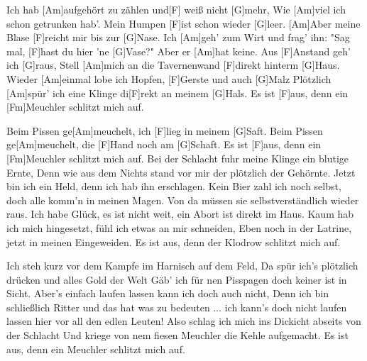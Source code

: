 

\begin{guitar}
	\vspace*{-0.1em}
	Ich hab [Am]aufgehört zu zählen und[F] weiß nicht [G]mehr,
	Wie [Am]viel ich schon getrunken hab'. Mein Humpen [F]ist schon wieder [G]leer.
	[Am]Aber meine Blase [F]reicht mir bis zur [G]Nase.
	Ich [Am]geh' zum Wirt und frag' ihn: "Sag mal, [F]hast du hier 'ne [G]Vase?"
	Aber er [Am]hat keine. Aus [F]Anstand geh' ich [G]raus,
	Stell [Am]mich an die Tavernenwand [F]direkt hinterm [G]Haus.
	Wieder [Am]einmal lobe ich Hopfen, [F]Gerste und auch [G]Malz
	Plötzlich [Am]spür' ich eine Klinge di[F]rekt an meinem [G]Hals.
	Es ist [F]aus, denn ein [Fm]Meuchler schlitzt mich auf.
	
	\vspace*{-0.1em}
	Beim Pissen ge[Am]meuchelt, ich [F]lieg in meinem [G]Saft.
	Beim Pissen ge[Am]meuchelt, die [F]Hand noch am [G]Schaft.
	Es ist [F]aus, denn ein [Fm]Meuchler schlitzt mich auf.
	\tiny
	\footnotesize{}
	Bei der Schlacht fuhr meine Klinge ein blutige Ernte,
	Denn wie aus dem Nichts stand vor mir der plötzlich der Gehörnte.
	Jetzt bin ich ein Held, denn ich hab ihn erschlagen.
	Kein Bier zahl ich noch selbst, doch alle komm’n in meinen Magen.
	Von da müssen sie selbstverständlich wieder raus.
	Ich habe Glück, es ist nicht weit, ein Abort ist direkt im Haus.
	Kaum hab ich mich hingesetzt, fühl ich etwas an mir schneiden,
	Eben noch in der Latrine, jetzt in meinen Eingeweiden.
	Es ist aus, denn der Klodrow schlitzt mich auf.
	
	 
	
	Ich steh kurz vor dem Kampfe im Harnisch auf dem Feld,
	Da spür ich’s plötzlich drücken und alles Gold der Welt
	Gäb’ ich für nen Pisspagen doch keiner ist in Sicht.
	Aber’s einfach laufen lassen kann ich doch auch nicht,
	Denn ich bin schließlich Ritter und das hat was zu bedeuten
	... ich kann’s doch nicht laufen lassen hier vor all den edlen Leuten!
	Also schlag ich mich ins Dickicht abseits von der Schlacht
	Und kriege von nem fiesen Meuchler die Kehle aufgemacht.
	Es ist aus, denn ein Meuchler schlitzt mich auf.
	

\end{guitar}
